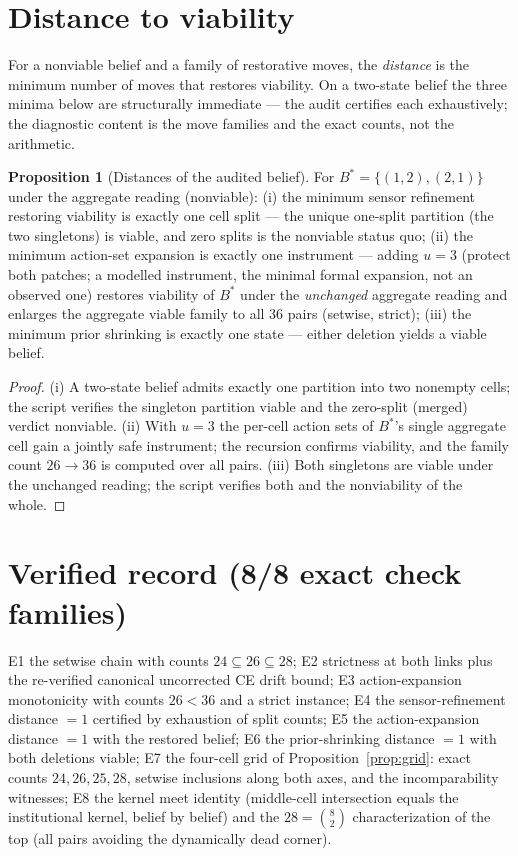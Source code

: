 \documentclass[10pt,twocolumn]{article}
\theoremstyle{definition}
\newtheorem{proposition}{Proposition}
\begin{document}
\section{Distance to viability}

For a nonviable belief and a family of restorative moves, the
\emph{distance} is the minimum number of moves that restores viability.
On a two-state belief the three minima below are structurally immediate
--- the audit certifies each exhaustively; the diagnostic content is the
move families and the exact counts, not the arithmetic.

\begin{proposition}[Distances of the audited belief]
\label{prop:dist}
For $B^\ast=\{(1,2),(2,1)\}$ under the aggregate reading (nonviable):
(i) the minimum sensor refinement restoring viability is exactly one cell
split --- the unique one-split partition (the two singletons) is viable,
and zero splits is the nonviable status quo; (ii) the minimum action-set
expansion is exactly one instrument --- adding $u=3$ (protect both
patches; a modelled instrument, the minimal formal expansion, not an
observed one) restores viability of $B^\ast$ under the \emph{unchanged}
aggregate
reading and enlarges the aggregate viable family to all $36$ pairs
(setwise, strict); (iii) the minimum prior shrinking is exactly one state
--- either deletion yields a viable belief.
\end{proposition}
\begin{proof}
(i) A two-state belief admits exactly one partition into two nonempty
cells; the script verifies the singleton partition viable and the
zero-split (merged) verdict nonviable. (ii) With $u=3$ the per-cell
action sets of $B^\ast$'s single aggregate cell gain a jointly safe
instrument; the recursion confirms viability, and the family count
$26\to36$ is computed over all pairs. (iii) Both singletons are viable
under the unchanged reading; the script verifies both and the nonviability
of the whole.
\end{proof}

\section{Verified record (8/8 exact check families)}

E1 the setwise chain with counts $24\subseteq26\subseteq28$; E2 strictness
at both links plus the re-verified canonical uncorrected CE drift bound;
E3 action-expansion monotonicity with counts $26<36$ and a strict
instance; E4 the sensor-refinement distance $=1$ certified by exhaustion
of split counts; E5 the action-expansion distance $=1$ with the restored
belief; E6 the prior-shrinking distance $=1$ with both deletions viable;
E7 the four-cell grid of Proposition~\ref{prop:grid}: exact counts
$24,26,25,28$, setwise inclusions along both axes, and the incomparability
witnesses; E8 the kernel meet identity (middle-cell intersection equals
the institutional kernel, belief by belief) and the $28=\binom{8}{2}$
characterization of the top (all pairs avoiding the dynamically dead
corner).
\end{document}

